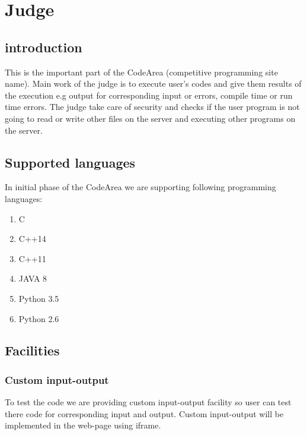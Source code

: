 
\newpage

\section{Judge}

\subsection{introduction}
This is the important part of the CodeArea (competitive programming site name).
Main work of the judge is to execute user's codes and give them results of the execution e.g output for corresponding input or errors, compile time or run time errors. The judge take care of security and checks if the user program is not going to read or write other files on the server and executing other programs on the server.


\subsection{Supported languages}
In initial phase of the CodeArea we are supporting following programming languages:
\begin{enumerate}
    \item C
    \item C++14
    \item C++11
    \item JAVA 8
    \item Python 3.5
    \item Python 2.6
\end{enumerate}

\vspace{1cm}

\subsection{Facilities}
\vspace{0.3cm}
\subsubsection{Custom input-output}
To test the code we are providing custom input-output facility so user can test there code for corresponding input and output. Custom input-output will be implemented in the web-page using iframe.
\newpage
